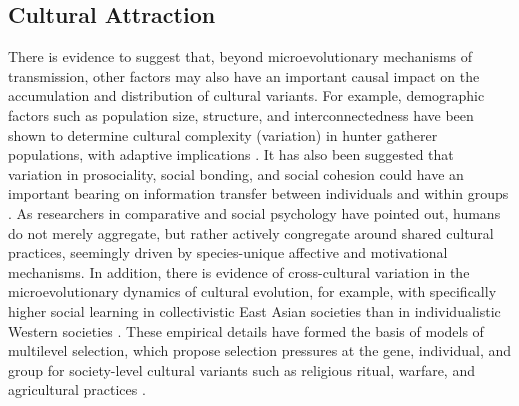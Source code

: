 \subsection{Cultural Attraction}
There is evidence to suggest that, beyond microevolutionary mechanisms of transmission, other factors may also have an important causal impact on the accumulation and distribution of cultural variants. For example, demographic factors such as population size, structure, and interconnectedness have been shown to determine cultural complexity (variation) in hunter gatherer populations, with adaptive implications \citep{Henrich2004}. It has also been suggested that variation in prosociality, social bonding, and social cohesion could have an important bearing on information transfer between individuals and within groups \citep{Heyes2011,Whitehouse2014,Wheatley2016}.  As researchers in comparative and social psychology have pointed out, humans do not merely aggregate, but rather actively congregate around shared cultural practices, seemingly driven by species-unique affective and motivational mechanisms\citep{Dunbar2010,Tomasello2005a}.  In addition, there is evidence of cross-cultural variation in the microevolutionary dynamics of cultural evolution, for example, with specifically higher social learning in collectivistic East Asian societies than in individualistic Western societies \citep{Mesoudi2015,DiYanni2015}.  These empirical details have formed the basis of models of multilevel selection, which propose selection pressures at the gene, individual, and group for society-level cultural variants such as religious ritual, warfare, and agricultural practices  \citep{Turchin2013,Atkinson2011a}.


